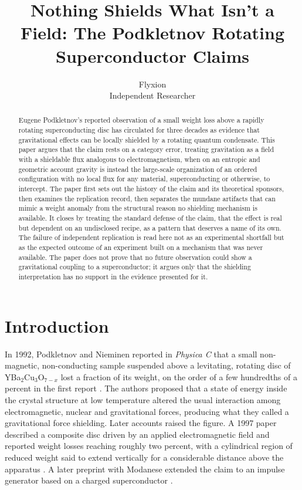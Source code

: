 \documentclass[11pt]{article}
\title{Nothing Shields What Isn't a Field: The Podkletnov Rotating Superconductor Claims}
\author{Flyxion \\ \small Independent Researcher}
\date{}
\begin{document}
\maketitle

\begin{abstract}
Eugene Podkletnov's reported observation of a small weight loss above a rapidly rotating superconducting disc has circulated for three decades as evidence that gravitational effects can be locally shielded by a rotating quantum condensate. This paper argues that the claim rests on a category error, treating gravitation as a field with a shieldable flux analogous to electromagnetism, when on an entropic and geometric account gravity is instead the large-scale organization of an ordered configuration with no local flux for any material, superconducting or otherwise, to intercept. The paper first sets out the history of the claim and its theoretical sponsors, then examines the replication record, then separates the mundane artifacts that can mimic a weight anomaly from the structural reason no shielding mechanism is available. It closes by treating the standard defense of the claim, that the effect is real but dependent on an undisclosed recipe, as a pattern that deserves a name of its own. The failure of independent replication is read here not as an experimental shortfall but as the expected outcome of an experiment built on a mechanism that was never available. The paper does not prove that no future observation could show a gravitational coupling to a superconductor; it argues only that the shielding interpretation has no support in the evidence presented for it.
\end{abstract}

\section{Introduction}

In 1992, Podkletnov and Nieminen reported in \emph{Physica C} that a small non-magnetic, non-conducting sample suspended above a levitating, rotating disc of YBa$_2$Cu$_3$O$_{7-x}$ lost a fraction of its weight, on the order of a few hundredths of a percent in the first report \cite{PN1992}. The authors proposed that a state of energy inside the crystal structure at low temperature altered the usual interaction among electromagnetic, nuclear and gravitational forces, producing what they called a gravitational force shielding. Later accounts raised the figure. A 1997 paper described a composite disc driven by an applied electromagnetic field and reported weight losses reaching roughly two percent, with a cylindrical region of reduced weight said to extend vertically for a considerable distance above the apparatus \cite{P1997}. A later preprint with Modanese extended the claim to an impulse generator based on a charged superconductor \cite{PM2003}.
\end{document}
